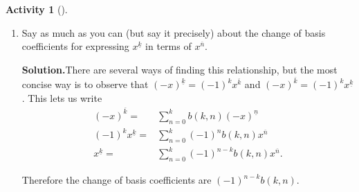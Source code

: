 \documentclass[10pt,]{book}
\theoremstyle{plain}
\theoremstyle{definition}
\newtheorem{activity}[project]{Activity}
\numberwithin{equation}{chapter}
\newcommand{\amp}{&}
\begin{document}
\begin{activity}[]
\begin{enumerate}[label=(\alph*)]
~\par
\item Say as much as you can (but say it precisely) about the change of basis coefficients for expressing \(x^{\underline{k}}\) in terms of \(x^{\overline{n}}\).%
\par\medskip\noindent%
\textbf{Solution.}\quad There are several ways of finding this relationship, but the most concise way is to observe that \((-x)^{\underline{k}}=(-1)^kx^{\overline{k}}\) and \((-x)^{\overline{k}}= (-1)^k x^{\underline{k}}\). This lets us write%
\begin{align*}
(-x)^{\overline{k}} =\amp \sum_{n=0}^k
b(k,n)(-x)^{\underline{n}}\\
(-1)^kx^{\underline{k}} =\amp \sum_{n=0}^k(-1)^nb(k,n)x^{\overline{n}}\\
x^{\underline{k}} =\amp \sum_{n=0}^k (-1)^{n-k}b(k,n)x^{\overline{n}}.
\end{align*}
%
\par
Therefore the change of basis coefficients are \((-1)^{n-k}b(k,n)\).%

\end{enumerate}
\end{activity}
\typeout{************************************************}
\typeout{************************************************}
\end{document}
